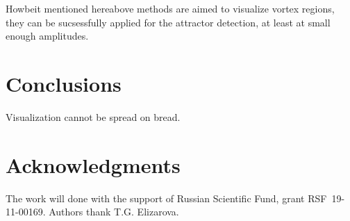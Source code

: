 \documentclass[a4wide,fontsize=12pt]{article}
\begin{document}
Howbeit mentioned hereabove methods are aimed to visualize vortex regions, they can be sucsessfully applied for the attractor detection, at least at small enough amplitudes.

\section{Conclusions}

Visualization cannot be spread on bread.

\section{Acknowledgments}



The work will done with the support of Russian Scientific Fund, grant RSF~19-11-00169.
Authors thank T.G. Elizarova.



\end{document}
